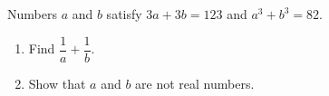 Numbers $a$ and $b$ satisfy $3a+3b=123$ and $a^3+b^3=82$.
\begin{enumerate}
\item[(a)] Find $\dfrac{1}{a}+\dfrac{1}{b}$.
\item[(b)] Show that $a$ and $b$ are not real numbers.
\end{enumerate}
